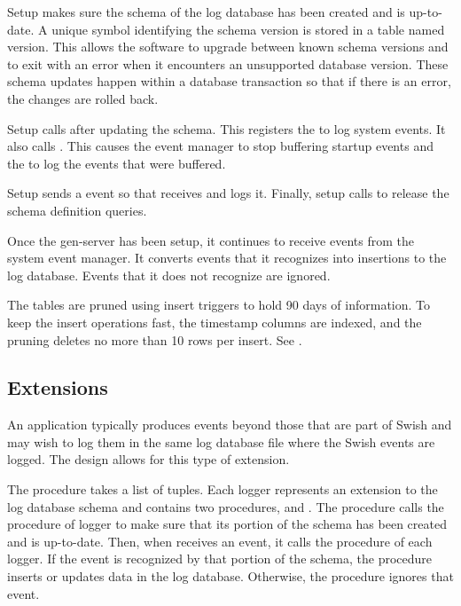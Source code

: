 Setup makes sure the schema of the log database has been created and
is up-to-date. A unique symbol identifying the schema version is
stored in a table named version. This allows the software to upgrade
between known schema versions and to exit with an error when it
encounters an unsupported database version. These schema updates
happen within a database transaction so that if there is an error, the
changes are rolled back.

Setup calls  after updating the
schema. This registers the  to log system events. It
also calls . This causes the event
manager to stop buffering startup events and the  to
log the events that were buffered.

Setup sends a  event so that 
receives and logs it. Finally, setup calls  to
release the schema definition queries.

Once the  gen-server has been setup, it continues to
receive events from the system event manager. It converts events that
it recognizes into insertions to the log database. Events that it does
not recognize are ignored.

The tables are pruned using insert triggers to hold 90 days of
information. To keep the insert operations fast, the timestamp columns
are indexed, and the pruning deletes no more than 10 rows per insert.
See \hyperref[make-swish-event-logger]{}.

\subsection {Extensions}

An application typically produces events beyond those that are part of
Swish and may wish to log them in the same log database file where the
Swish events are logged. The  design allows for this
type of extension.

The  procedure takes a list of
 tuples. Each logger represents an extension
to the log database schema and contains two procedures, 
and . The  procedure calls the
 procedure of logger to make sure that its portion of
the schema has been created and is up-to-date. Then, when
 receives an event, it calls the  procedure
of each logger. If the event is recognized by that portion of the
schema, the  procedure inserts or updates data in the log
database. Otherwise, the procedure ignores that event.

